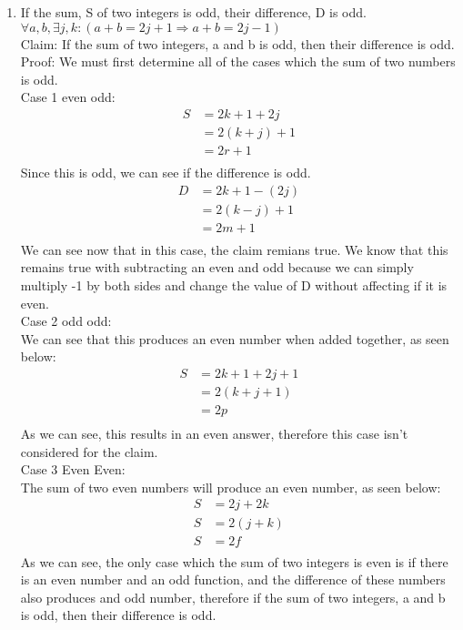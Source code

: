 \documentclass{letter}
\theoremstyle{definition}
\begin{document}
\begin{description}
\begin{enumerate}
		\item If the sum, S of two integers is odd, their difference, D is odd. \\
$\forall a,b, \exists j,k:(a+b=2j+1 \Rightarrow a+b=2j-1)$ \\
Claim: If the sum of two integers, a and b is odd, then their difference is odd. \\
Proof: We must first determine all of the cases which the sum of two numbers is odd.\\
Case 1 even odd: \\
\begin{align*}
S &= 2k+1+2j \\
&= 2(k+j)+1 \tag{Factored out two} \\
&= 2r+1 \tag{Set r=k+j} \\
\end{align*}
Since this is odd, we can see if the difference is odd. \\
\begin{align*}
D &= 2k+1-(2j) \\
&= 2(k-j)+1 \tag{Factor out 2} \\
&= 2m+1 \tag{Set k-j equal to m} \\
\end{align*} 
We can see now that in this case, the claim remians true. We know that this remains true with subtracting an even and odd because we can simply multiply -1 by both sides and change the value of D without affecting if it is even. \\
Case 2 odd odd: \\
We can see that this produces an even number when added together, as seen below: \\
\begin{align*}
S &= 2k+1+2j+1 \\
&=2(k+j+1) \tag{Factored out the 2}\\
&= 2p \tag{set p as k+j+1} \\
\end{align*}
As we can see, this results in an even answer, therefore this case isn't considered for the claim. \\
Case 3 Even Even: \\
The sum of two even numbers will produce an even number, as seen below:
\begin{align*}
S &= 2j+2k \\
S &= 2(j+k) \tag{Factored out 2} \\
S &= 2f \tag{Set f equal to j+k} \\
\end{align*}
As we can see, the only case which the sum of two integers is even is if there is an even number and an odd function, and the difference of these numbers also produces and odd number, therefore if the sum of two integers, a and b is odd, then their difference is odd.







\end{enumerate}
\end{description}
\end{document}
